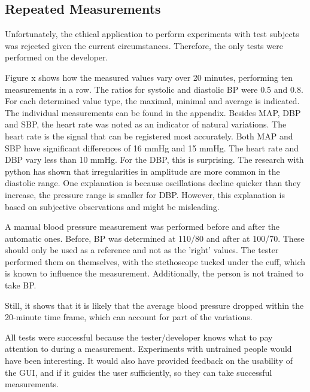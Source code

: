\subsection{Repeated Measurements}
Unfortunately, the ethical application to perform experiments with test subjects was rejected given the current circumstances. Therefore, the only tests were performed on the developer. 

Figure x shows how the measured values vary over 20 minutes, performing ten measurements in a row. The ratios for systolic and diastolic BP were 0.5 and 0.8. For each determined value type, the maximal, minimal and average is indicated. The individual measurements can be found in the appendix. Besides MAP, DBP and SBP, the heart rate was noted as an indicator of natural variations. The heart rate is the signal that can be registered most accurately. Both MAP and SBP have significant differences of 16 mmHg and 15 mmHg. The heart rate and DBP vary less than 10 mmHg. For the DBP, this is surprising. The research with python has shown that irregularities in amplitude are more common in the diastolic range. One explanation is because oscillations decline quicker than they increase, the pressure range is smaller for DBP. However, this explanation is based on subjective observations and might be misleading. 

A manual blood pressure measurement was performed before and after the automatic ones. Before, BP was determined at 110/80 and after at 100/70. These should only be used as a reference and not as the 'right' values. The tester performed them on themselves, with the stethoscope tucked under the cuff, which is known to influence the measurement. Additionally, the person is not trained to take BP. 

Still, it shows that it is likely that the average blood pressure dropped within the 20-minute time frame, which can account for part of the variations.

All tests were successful because the tester/developer knows what to pay attention to during a measurement. Experiments with untrained people would have been interesting. It would also have provided feedback on the usability of the GUI, and if it guides the user sufficiently, so they can take successful measurements. 